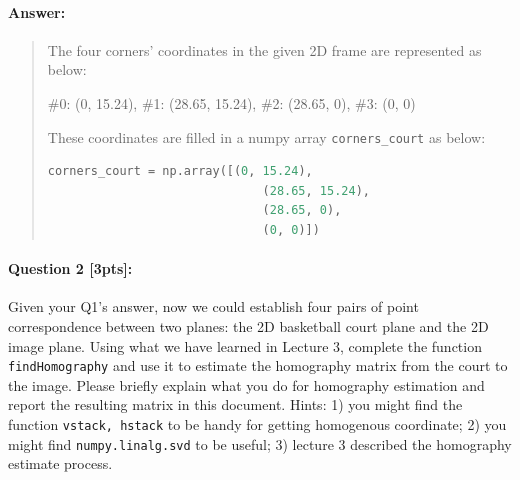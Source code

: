 \documentclass[11pt]{article}
\begin{document}
\paragraph{Answer:} 
\begin{quote}
    The four corners' coordinates in the given 2D frame are represented as below:

    \#0: (0, 15.24), \#1: (28.65, 15.24), \#2: (28.65, 0), \#3: (0, 0)

    These coordinates are filled in a numpy array \verb|corners_court| as below:
    \begin{lstlisting}[language=Python]
    corners_court = np.array([(0, 15.24),
                              (28.65, 15.24),
                              (28.65, 0),
                              (0, 0)])
    \end{lstlisting}
\end{quote}

\paragraph{Question 2 [3pts]:}
Given your Q1's answer, now we could establish four pairs of point correspondence between two planes: the 2D basketball court plane and the 2D image plane. Using what we have learned in Lecture 3, complete the function \texttt{findHomography} and use it to estimate the homography matrix from the court to the image. Please briefly explain what you do for homography estimation and report the resulting matrix in this document. Hints: 1) you might find the function \texttt{vstack, hstack} to be handy for getting homogenous coordinate; 2) you might find \texttt{numpy.linalg.svd} to be useful; 3) lecture 3 described the homography estimate process. 
\end{document}
